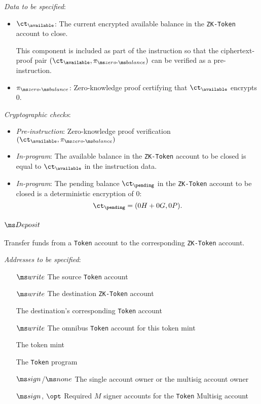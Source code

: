 \noindent
\textit{Data to be specified}:
\begin{itemize}
  \item $\ct_\available$: The current encrypted available balance in the
    \texttt{ZK-Token} account to close.

    This component is included as part of the instruction so that the
    ciphertext-proof pair $(\ct_\available, \pizero)$ can be verified as
    a pre-instruction.

  \item $\pizero$: Zero-knowledge proof certifying that $\ct_\available$
    encrypts $0$.
\end{itemize}

\noindent
\textit{Cryptographic checks}:
\begin{itemize}
  \item \textit{Pre-instruction}: Zero-knowledge proof verification
    $(\ct_\available, \pizero)$
  \item \textit{In-program}: The available balance in the \texttt{ZK-Token} account
    to be closed is equal to $\ct_\available$ in the instruction data.
  \item \textit{In-program}: The pending balance $\ct_\pending$ in the
    \texttt{ZK-Token} account to be closed is a deterministic encryption of 0:
    \[ \ct_\pending = (0H + 0G, 0P) .\]
\end{itemize}


\newpage
\subsubsection{$\Deposit$}
Transfer funds from a \texttt{Token} account to the corresponding
\texttt{ZK-Token} account.
\vspace{0.5em}

\noindent
\textit{Addresses to be specified}:
\begin{itemize}[leftmargin=2.5cm]
  \item[$\writable$] The source \texttt{Token} account
  \item[$\writable$] The destination \texttt{ZK-Token} account
  \item[] The destination's corresponding \texttt{Token} account
  \item[$\writable$] The omnibus \texttt{Token} account for this token mint
  \item[] The token mint
  \item[] The \texttt{Token} program
  \item[$\signer$/$\none$] The single account owner or the multisig account owner
  \item[$\signer$, $\opt$]  Required $M$ signer accounts for the \texttt{Token}
    Multisig account
\end{itemize}

